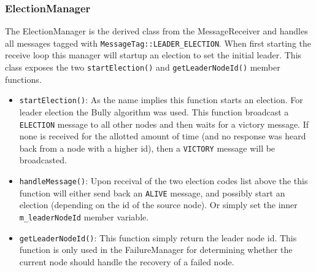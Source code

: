 \documentclass[11pt]{article}
\begin{document}
\subsubsection{ElectionManager}
The ElectionManager is the derived class from the MessageReceiver and handles
all messages tagged with \texttt{MessageTag::LEADER\_ELECTION}. When first
starting the receive loop this manager will startup an election to set the
initial leader. This class exposes the two \texttt{startElection()} and
\texttt{getLeaderNodeId()} member functions.\\
\begin{itemize}
\item \texttt{startElection()}: As the name implies this
function starts an election. For leader election the Bully algorithm was
used. This function broadcast a \texttt{ELECTION} message to all other nodes and
then waits for a victory message. If none is received for the allotted amount of
time (and no response was heard back from a node with a higher id), then a
\texttt{VICTORY} message will be broadcasted.\\
\item \texttt{handleMessage()}: Upon receival of the two election codes list above
the this function will either send back an \texttt{ALIVE} message, and possibly
start an election (depending on the id of the source node). Or simply set the
inner \texttt{m\_leaderNodeId} member variable.\\
\item \texttt{getLeaderNodeId()}: This function simply return the leader node
id. This function is only used in the FailureManager for determining whether the
current node should handle the recovery of a failed node.
\end{itemize}
\end{document}
